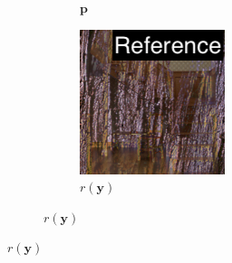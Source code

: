 \begin{figure}[]
\begin{subfigure}{\textwidth}
\begin{subfigure}{0.19\textwidth}
            \caption{\(\bm{p}\)}
            \label{fig:ex03-staircase_illum-wood-pixel_im}
        \end{subfigure}
        \hfill
        \begin{subfigure}{0.19\textwidth}
            \centering
            \includegraphics[width=\textwidth]{images/04-experiment03/staircase_illum/wood/pixel_proj_label.jpg}
            \caption{\(r(\bm{y})\)}
            \label{fig:ex03-staircase_illum-wood-pixel_proj}
        \end{subfigure}
        

\end{subfigure}
\end{figure}
